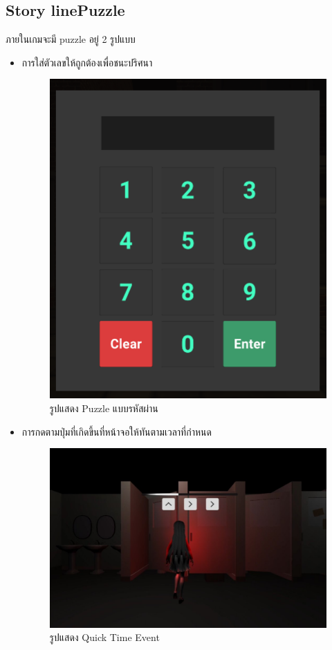 \subsection{\ifenglish Story line\else Puzzle\fi }
ภายในเกมจะมี puzzle อยู่ 2 รูปแบบ
\begin{itemize}
    \item การใส่ตัวเลขให้ถูกต้องเพื่อชนะปริศนา
          \begin{figure}[h]
              \centering
              \includegraphics[scale=0.5]{Images/Password Image.png}
              \caption{รูปแสดง Puzzle แบบรหัสผ่าน}
          \end{figure}
    \item การกดตามปุ่มที่เกิดขึ้นที่หน้าจอให้ทันตามเวลาที่กำหนด
          \begin{figure}[h]
              \centering
              \includegraphics[scale=0.15]{Images/tutorial_qte.png}
              \caption{รูปแสดง Quick Time Event}
          \end{figure}
\end{itemize}
